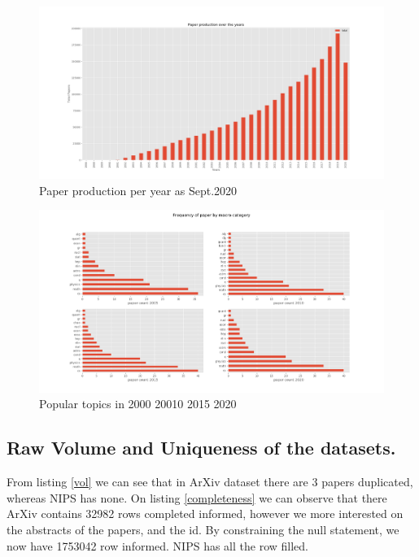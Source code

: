 \begin{figure}
\centering
\includegraphics[width=1\linewidth]{images/paper_prod}
\caption{Paper production per year as Sept.2020}
\label{fig:paper_prod}
\end{figure}


\begin{figure}
\centering
\includegraphics[width=1\linewidth]{images/paper_topics}
\caption{Popular topics in 2000 20010 2015 2020}
\label{fig:paper_topics}
\end{figure}

\subsection{Raw Volume and Uniqueness of the datasets.}

From listing \ref{vol} we can see that in ArXiv dataset there are 3 papers duplicated, whereas NIPS has none. On listing \ref{completeness}
we can observe that there ArXiv contains 32982 rows completed informed, however we more interested on the abstracts of the papers, and the id. 
By constraining the null statement, we now have 1753042 row informed. NIPS has all the row filled. 

